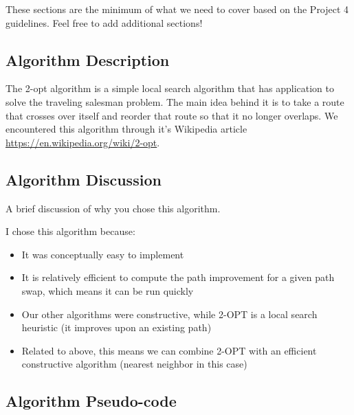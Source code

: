 \documentclass[../report/main.tex]{subfiles}
\begin{document}
These sections are the minimum of what we need to cover based on the Project 4 guidelines. Feel free to add additional sections!

\subsection*{Algorithm Description}

The 2-opt algorithm is a simple local search algorithm that has application to solve the traveling salesman problem. The main idea behind it is to take a route that crosses over itself and reorder that route so that it no longer overlaps. We encountered this algorithm through it's Wikipedia article \url{https://en.wikipedia.org/wiki/2-opt}.

\subsection*{Algorithm Discussion}

A brief discussion of why you chose this algorithm.

I chose this algorithm because:
\begin{itemize}
	\item It was conceptually easy to implement
	\item It is relatively efficient to compute the path improvement for a given path swap, which means it can be run quickly
	\item Our other algorithms were constructive, while 2-OPT is a local search heuristic (it improves upon an existing path)
	\item Related to above, this means we can combine 2-OPT with an efficient constructive algorithm (nearest neighbor in this case)
\end{itemize}

\subsection*{Algorithm Pseudo-code}
\end{document}
